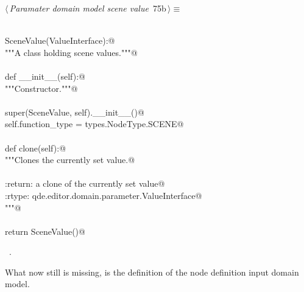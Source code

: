 \documentclass[
    a4paper,      %
    10pt,         %
    openright,    %
    notitlepage,  %
    parskip=half, %
]{scrreprt}       %
\theoremstyle{definition}                    %
\begin{document}
\begin{flushleft} \small
\begin{minipage}{\linewidth}\label{scrap123}\raggedright\small
{} $\langle\,${\itshape Paramater domain model scene value}\nobreak\ {\footnotesize {75b}}$\,\rangle\equiv$
\vspace{-1exm}
\begin{list}{}{} \item
\mbox{}\lstinline@@\\
\mbox{}\lstinline@class SceneValue(ValueInterface):@\\
\mbox{}\lstinline@    """A class holding scene values."""@\\
\mbox{}\lstinline@@\\
\mbox{}\lstinline@    def __init__(self):@\\
\mbox{}\lstinline@        """Constructor."""@\\
\mbox{}\lstinline@@\\
\mbox{}\lstinline@        super(SceneValue, self).__init__()@\\
\mbox{}\lstinline@        self.function_type = types.NodeType.SCENE@\\
\mbox{}\lstinline@@\\
\mbox{}\lstinline@    def clone(self):@\\
\mbox{}\lstinline@        """Clones the currently set value.@\\
\mbox{}\lstinline@@\\
\mbox{}\lstinline@        :return: a clone of the currently set value@\\
\mbox{}\lstinline@        :rtype:  qde.editor.domain.parameter.ValueInterface@\\
\mbox{}\lstinline@        """@\\
\mbox{}\lstinline@@\\
\mbox{}\lstinline@        return SceneValue()@{\NWsep}
\end{list}
\vspace{-1.5ex}
\footnotesize
\begin{list}{}{\setlength{\itemsep}{-\parsep}\setlength{\itemindent}{-\leftmargin}}
\item \NWtxtMacroRefIn\ .

\item{}
\end{list}
\end{minipage}\vspace{4ex}
\end{flushleft}
What now still is missing, is the definition of the node definition input
domain model.
\end{document}
